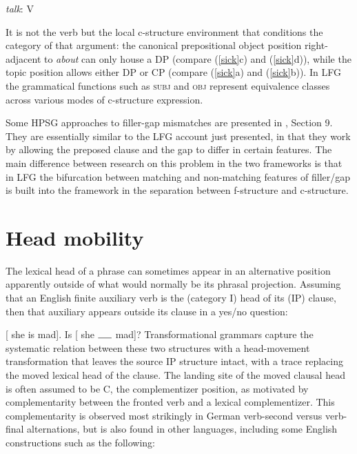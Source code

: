 \eal \label{talk-about}
{{\it talk}\/: V}\qquad{}    
\zl

\noindent
It is not the verb but the local c-structure environment that conditions the category of that argument: the canonical prepositional object position right-adjacent to \textit{about} can only house a DP (compare (\ref{sick}c) and (\ref{sick}d)), while the topic position allows either DP or CP (compare (\ref{sick}a) and (\ref{sick}b)).  In LFG the grammatical functions such as \textsc{subj} and \textsc{obj} represent equivalence classes across various modes of c-structure expression.  

Some HPSG approaches to filler-gap mismatches are presented in , Section 9.  They are essentially similar to the LFG account just presented, in that they work by allowing the preposed clause and the gap to differ in certain features.  The main difference between research on this problem in the two frameworks is that in LFG the bifurcation between matching and non-matching features of filler/gap  is built into the framework in the separation between f-structure and c-structure.  



\section{Head mobility} 
\label{mobile-sec}
The lexical head of a phrase can sometimes appear in an alternative position apparently outside of what would normally be its phrasal projection.  Assuming that an English finite auxiliary verb is the (category I) head of its (IP) clause, then that auxiliary appears outside its clause in a yes/no question:

\eal 
\label{mad}
\ex {} [ she is mad].
\ex  Is   [ she $\rule{0.5cm}{0.15mm}$ mad]?
\zl
Transformational grammars capture the systematic relation between these two structures with a head-movement transformation that leaves the source IP structure intact, with a trace replacing the moved lexical head of the clause.  The landing site of the moved clausal head is often assumed to be C, the complementizer position, as motivated by complementarity between the fronted verb and a lexical complementizer.  This complementarity is observed most strikingly in German verb-second versus verb-final alternations, but is also found in other languages, including some English constructions such as the following:  

